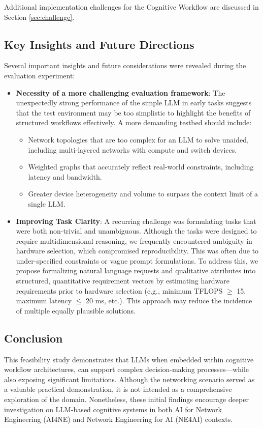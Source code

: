 Additional implementation challenges for the Cognitive Workflow are discussed in Section \ref{sec:challenge}.



\subsection{Key Insights and Future Directions}


Several important insights and future considerations were revealed during the evaluation experiment:

\begin{itemize}[leftmargin=*, label=--]

  \item \textbf{Necessity of a more challenging evaluation framework}: The unexpectedly strong performance of the simple LLM in early tasks suggests that the test environment may be too simplistic to highlight the benefits of structured workflows effectively. A more demanding testbed should include:
    \begin{itemize}[leftmargin=2em, label=--]
      \item Network topologies that are too complex for an LLM to solve unaided, including multi-layered networks with compute and switch devices.
      \item Weighted graphs that accurately reflect real-world constraints, including latency and bandwidth.
      \item Greater device heterogeneity and volume to surpass the context limit of a single LLM.
    \end{itemize}

  \item \textbf{Improving Task Clarity}: A recurring challenge was formulating tasks that were both non-trivial and unambiguous. Although the tasks were designed to require multidimensional reasoning, we frequently encountered ambiguity in hardware selection, which compromised reproducibility. This was often due to under-specified constraints or vague prompt formulations. To address this, we propose formalizing natural language requests and qualitative attributes into structured, quantitative requirement vectors by estimating hardware requirements prior to hardware selection (e.g., minimum TFLOPS $\geq$ 15, maximum latency $\leq$ 20 ms, etc.). This approach may reduce the incidence of multiple equally plausible solutions.

\end{itemize}


\subsection{Conclusion}
This feasibility study demonstrates that LLMs when embedded within cognitive workflow architectures, can support complex decision-making processes—while also exposing significant limitations. Although the networking scenario served as a valuable practical demonstration, it is not intended as a comprehensive exploration of the domain. Nonetheless, these initial findings encourage deeper investigation  on LLM-based cognitive systems in both AI for Network Engineering (AI4NE) and Network Engineering for AI (NE4AI) contexts.

